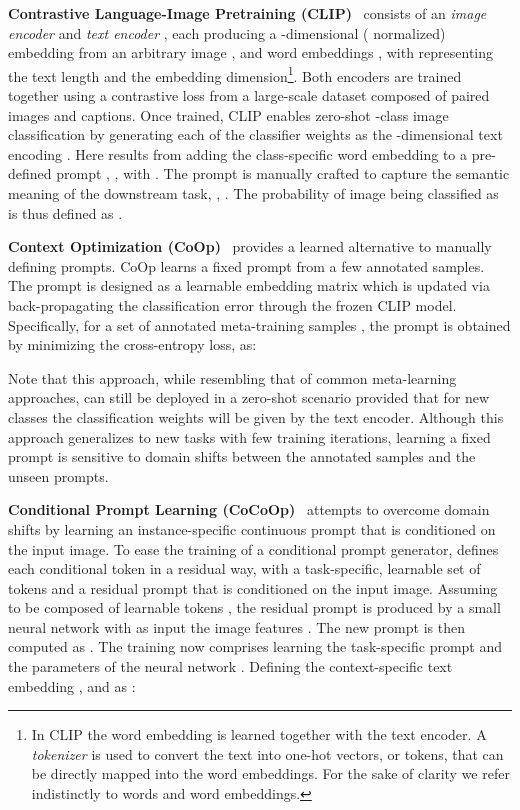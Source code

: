 \documentclass[10pt,twocolumn,letterpaper]{article}
\begin{document}
\textbf{Contrastive Language-Image Pretraining (CLIP)}~\cite{clip_icml21} consists of an \textit{image encoder}  and \textit{text encoder} , each producing a -dimensional ( normalized) embedding from an arbitrary image , and word embeddings , with  representing the text length and  the embedding dimension\footnote{In CLIP the word embedding is learned together with the text encoder. A \textit{tokenizer} is used to convert the text into one-hot vectors, or tokens, that can be directly mapped into the word embeddings. For the sake of clarity we refer indistinctly to words and word embeddings.}. Both encoders are trained together using a contrastive loss from a large-scale dataset composed of paired images and captions. Once trained, CLIP enables zero-shot -class image classification by generating each of the  classifier weights  as the -dimensional text encoding . Here  results from adding the class-specific word embedding  to a pre-defined prompt , \ie,  with . The prompt  is manually crafted to capture the semantic meaning of the downstream task, \eg, . The probability of image  being classified as  is thus defined as 
. 


\textbf{Context Optimization (CoOp)}~\cite{zhou2022learning} provides a learned alternative to manually defining prompts. CoOp learns a fixed prompt from a few annotated samples. The prompt is designed as a learnable embedding matrix  which is updated via back-propagating the classification error through the frozen CLIP model. Specifically, for a set of  annotated meta-training samples , the prompt  is obtained by minimizing the cross-entropy loss, as:

Note that this approach, while resembling that of common meta-learning approaches, can still be deployed in a zero-shot scenario provided that for new classes the classification weights will be given by the text encoder. Although this approach generalizes to new tasks with few training iterations, learning a fixed prompt is sensitive to domain shifts between the annotated samples and the unseen prompts. 


\textbf{Conditional Prompt Learning (CoCoOp)}~\cite{zhou2022conditional} attempts to overcome domain shifts by learning an instance-specific continuous prompt that is conditioned on the input image. To ease the training of a conditional prompt generator, \cocoop defines each conditional token in a residual way, with a task-specific, learnable set of tokens  and a residual prompt that is conditioned on the input image. Assuming  to be composed of  learnable tokens , the residual prompt  is produced by a small neural network  with as input the image features . The new prompt is then computed as . The training now comprises learning the task-specific prompt  and the parameters  of the neural network . Defining the context-specific text embedding , and  as :
\end{document}
